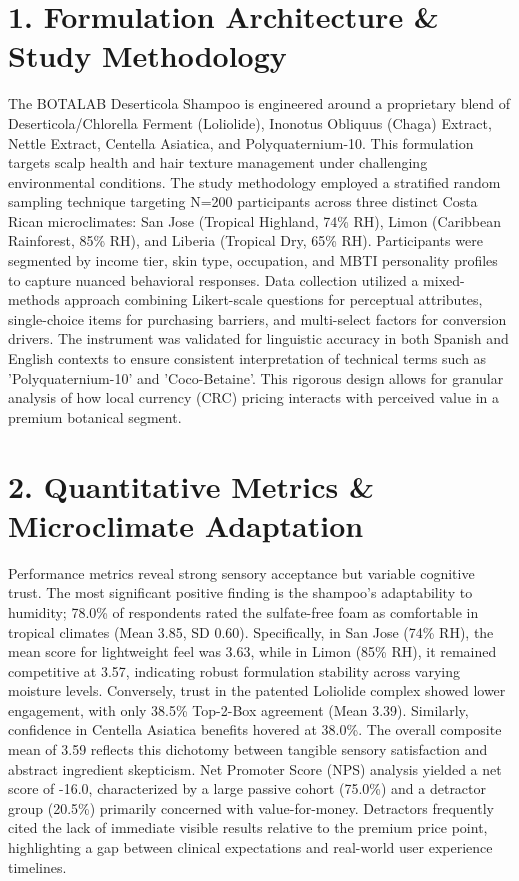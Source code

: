 \documentclass[10pt,twocolumn,a4paper]{article}
\begin{document}
\section{1. Formulation Architecture \& Study Methodology}
The BOTALAB Deserticola Shampoo is engineered around a proprietary blend of Deserticola/Chlorella Ferment (Loliolide), Inonotus Obliquus (Chaga) Extract, Nettle Extract, Centella Asiatica, and Polyquaternium-10. This formulation targets scalp health and hair texture management under challenging environmental conditions. The study methodology employed a stratified random sampling technique targeting N=200 participants across three distinct Costa Rican microclimates: San Jose (Tropical Highland, 74\% RH), Limon (Caribbean Rainforest, 85\% RH), and Liberia (Tropical Dry, 65\% RH). Participants were segmented by income tier, skin type, occupation, and MBTI personality profiles to capture nuanced behavioral responses. Data collection utilized a mixed-methods approach combining Likert-scale questions for perceptual attributes, single-choice items for purchasing barriers, and multi-select factors for conversion drivers. The instrument was validated for linguistic accuracy in both Spanish and English contexts to ensure consistent interpretation of technical terms such as 'Polyquaternium-10' and 'Coco-Betaine'. This rigorous design allows for granular analysis of how local currency (CRC) pricing interacts with perceived value in a premium botanical segment.
\section{2. Quantitative Metrics \& Microclimate Adaptation}
Performance metrics reveal strong sensory acceptance but variable cognitive trust. The most significant positive finding is the shampoo’s adaptability to humidity; 78.0\% of respondents rated the sulfate-free foam as comfortable in tropical climates (Mean 3.85, SD 0.60). Specifically, in San Jose (74\% RH), the mean score for lightweight feel was 3.63, while in Limon (85\% RH), it remained competitive at 3.57, indicating robust formulation stability across varying moisture levels. Conversely, trust in the patented Loliolide complex showed lower engagement, with only 38.5\% Top-2-Box agreement (Mean 3.39). Similarly, confidence in Centella Asiatica benefits hovered at 38.0\%. The overall composite mean of 3.59 reflects this dichotomy between tangible sensory satisfaction and abstract ingredient skepticism. Net Promoter Score (NPS) analysis yielded a net score of -16.0, characterized by a large passive cohort (75.0\%) and a detractor group (20.5\%) primarily concerned with value-for-money. Detractors frequently cited the lack of immediate visible results relative to the premium price point, highlighting a gap between clinical expectations and real-world user experience timelines.
\end{document}
